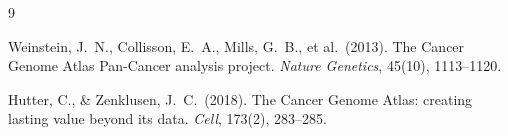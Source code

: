 \documentclass[11pt,letterpaper]{article}
\begin{document}

\begin{thebibliography}{9}

Weinstein, J.~N., Collisson, E.~A., Mills, G.~B., et al.\ (2013).
The Cancer Genome Atlas Pan-Cancer analysis project.
\textit{Nature Genetics}, 45(10), 1113--1120.

Hutter, C., \& Zenklusen, J.~C.\ (2018).
The Cancer Genome Atlas: creating lasting value beyond its data.
\textit{Cell}, 173(2), 283--285.

\end{thebibliography}
\end{document}
